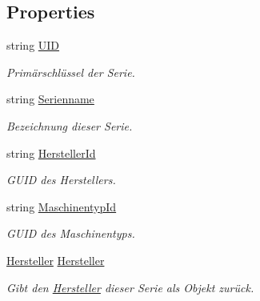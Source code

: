 \subsection*{Properties}
\begin{DoxyCompactItemize}
\item 
string \hyperlink{class_products_1_1_model_1_1_entities_1_1_maschinenserie_a46db3f3ce980cb47914a361d5079da99}{U\+ID}
\begin{DoxyCompactList}\small\item\em Primärschlüssel der Serie. \end{DoxyCompactList}\item 
string \hyperlink{class_products_1_1_model_1_1_entities_1_1_maschinenserie_a9eb8e1bddad0fdc7835c6cabd2ec269f}{Serienname}
\begin{DoxyCompactList}\small\item\em Bezeichnung dieser Serie. \end{DoxyCompactList}\item 
string \hyperlink{class_products_1_1_model_1_1_entities_1_1_maschinenserie_ad38ca70da9e89a7daae0088e76b93aba}{Hersteller\+Id}
\begin{DoxyCompactList}\small\item\em G\+U\+ID des Herstellers. \end{DoxyCompactList}\item 
string \hyperlink{class_products_1_1_model_1_1_entities_1_1_maschinenserie_af944d81c3bc2d93ad7c58186900ce9bc}{Maschinentyp\+Id}
\begin{DoxyCompactList}\small\item\em G\+U\+ID des Maschinentyps. \end{DoxyCompactList}\item 
\hyperlink{class_products_1_1_model_1_1_entities_1_1_hersteller}{Hersteller} \hyperlink{class_products_1_1_model_1_1_entities_1_1_maschinenserie_a7d51a91c6227ccd37658b96344e3d197}{Hersteller}
\begin{DoxyCompactList}\small\item\em Gibt den \hyperlink{class_products_1_1_model_1_1_entities_1_1_hersteller}{Hersteller} dieser Serie als Objekt zurück. \end{DoxyCompactList}\item 

\end{DoxyCompactItemize}
